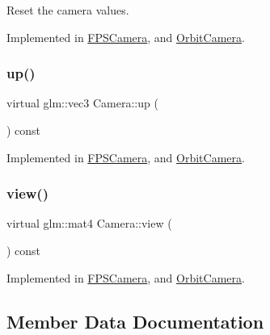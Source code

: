 Reset the camera values. 



Implemented in \hyperlink{classFPSCamera_a5076d0c700255c33daff490d73c77761}{F\+P\+S\+Camera}, and \hyperlink{classOrbitCamera_a022751aa06693232844732adb00e7d71}{Orbit\+Camera}.

\mbox{\label{classCamera_a3ec282533cfc02be93006259d383b6d2}} 
\subsubsection{\texorpdfstring{up()}{up()}}
{\footnotesize\ttfamily virtual glm\+::vec3 Camera\+::up (\begin{DoxyParamCaption}{ }\end{DoxyParamCaption}) const\hspace{0.3cm}{\ttfamily [pure virtual]}}



Implemented in \hyperlink{classFPSCamera_a1b6470a9ebb906bc31a2742b943552a1}{F\+P\+S\+Camera}, and \hyperlink{classOrbitCamera_a1d65d137e3ef3f32c3b8eb31b49047fc}{Orbit\+Camera}.

\mbox{\label{classCamera_a279a5a9fdcdb6161bab2c3ff8fce275b}} 
\subsubsection{\texorpdfstring{view()}{view()}}
{\footnotesize\ttfamily virtual glm\+::mat4 Camera\+::view (\begin{DoxyParamCaption}{ }\end{DoxyParamCaption}) const\hspace{0.3cm}{\ttfamily [pure virtual]}}



Implemented in \hyperlink{classFPSCamera_a41a04414a362e7aa866d490900830cb8}{F\+P\+S\+Camera}, and \hyperlink{classOrbitCamera_a07595f9d11666c180934e47ba8abae73}{Orbit\+Camera}.



\subsection{Member Data Documentation}
\mbox{\label{classCamera_a4b8929090b9d34548058e10f744f7156}} 
